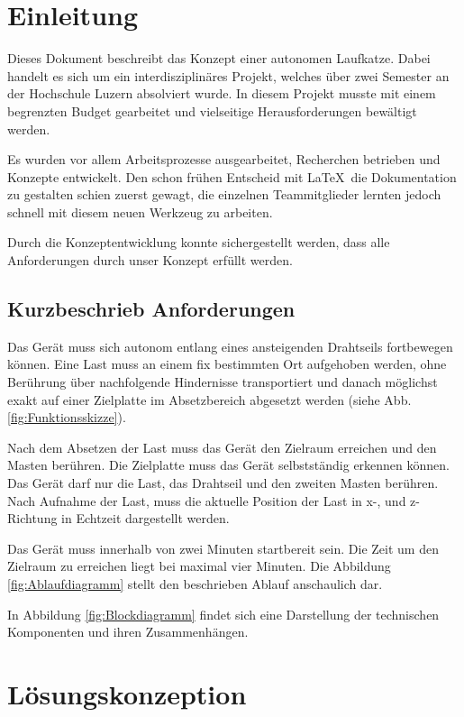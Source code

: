 \documentclass[a4paper]{report}
\begin{document}
\tableofcontents

\newpage


\chapter{Einleitung}
\label{ch:Intro}
Dieses Dokument beschreibt das Konzept einer autonomen Laufkatze. Dabei handelt es sich um ein interdisziplinäres Projekt, welches über zwei Semester an der Hochschule Luzern absolviert wurde. In diesem Projekt musste mit einem begrenzten Budget gearbeitet und vielseitige Herausforderungen bewältigt werden.

Es wurden vor allem Arbeitsprozesse ausgearbeitet, Recherchen betrieben und Konzepte entwickelt. Den schon frühen Entscheid mit \LaTeX\ die Dokumentation zu gestalten schien zuerst gewagt, die einzelnen Teammitglieder lernten jedoch schnell mit diesem neuen Werkzeug zu arbeiten.

Durch die Konzeptentwicklung konnte sichergestellt werden, dass alle Anforderungen durch unser Konzept erfüllt werden.

\section{Kurzbeschrieb Anforderungen}
\label{sec:KurzAnforder}
Das Gerät muss sich autonom entlang eines ansteigenden Drahtseils fortbewegen können. Eine Last muss an einem fix bestimmten Ort aufgehoben werden, ohne Berührung über nachfolgende Hindernisse transportiert und danach möglichst exakt auf einer Zielplatte im Absetzbereich abgesetzt werden (siehe Abb.\ref{fig:Funktionsskizze}).

Nach dem Absetzen der Last muss das Gerät den Zielraum erreichen und den Masten berühren. Die Zielplatte muss das Gerät selbstständig erkennen können. Das Gerät darf nur die Last, das Drahtseil und den zweiten Masten berühren. Nach Aufnahme der Last, muss die aktuelle Position der Last in x-, und z-Richtung in Echtzeit dargestellt werden. 

Das Gerät muss innerhalb von zwei Minuten startbereit sein. Die Zeit um den Zielraum zu erreichen liegt bei maximal vier Minuten. Die Abbildung \ref{fig:Ablaufdiagramm} stellt den beschrieben Ablauf anschaulich dar.

In Abbildung \ref{fig:Blockdiagramm} findet sich eine Darstellung der technischen Komponenten und ihren Zusammenhängen.

\chapter{Lösungskonzeption}
\label{ch:Loesungskonzept}
\end{document}
